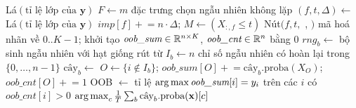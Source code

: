 \begin{algorithm}[H]
\caption{Huấn luyện và dự đoán Random Forest}\label{alg:rf}
\begin{algorithmic}[1]
   \Return Lá$(\text{tỉ lệ lớp của }\mathbf{y})$ \EndIf
  \State $F\gets m$ đặc trưng chọn ngẫu nhiên không lặp
  \State $(f,t,\Delta)\gets$ 
   \Return Lá$(\text{tỉ lệ lớp của }\mathbf{y})$ \EndIf
  \State $\textit{imp}[f]\mathrel{+}=n\cdot\Delta$;\; $M\gets(X_{:,f}\le t)$
  \State \Return Nút$\big(f,t,$ , $\big)$
\EndFunction
{}
  \State mã hoá nhãn về $0..K{-}1$; khởi tạo $\textit{oob\_sum}\in\mathbb{R}^{n\times K}$, $\textit{oob\_cnt}\in\mathbb{R}^n$ bằng 0
    \State $\textit{rng}_b\gets$ bộ sinh ngẫu nhiên với hạt giống rút từ 
    \State $I_b\gets n$ chỉ số ngẫu nhiên có hoàn lại trong $\{0,\dots,n{-}1\}$ 
    \State $\text{cây}_b\gets$ 
    \State $O\gets\{i\notin I_b\}$;\; $\textit{oob\_sum}[O]\mathrel{+}=\text{cây}_b.\text{proba}(X_O)$;\; $\textit{oob\_cnt}[O]\mathrel{+}=1$
  \EndFor
  \State OOB $\gets$ tỉ lệ $\operatorname*{arg\,max}\textit{oob\_sum}[i]=y_i$ trên các $i$ có $\textit{oob\_cnt}[i]>0$
\EndFunction
{}
  \State \Return $\operatorname*{arg\,max}_c \frac1T\sum_b \text{cây}_b.\text{proba}(\mathbf{x})[c]$ 
\EndFunction
\end{algorithmic}
\end{algorithm}
 
